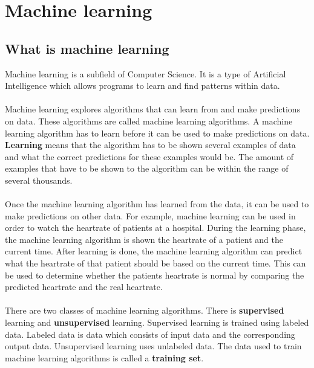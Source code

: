 
\chapter{Machine learning} %

\label{Chapter2} %
\section{What is machine learning}
Machine learning is a subfield of Computer Science. It is a type of Artificial Intelligence which allows programs to learn and find patterns within data. \cite{coursera} \\
\\
Machine learning explores algorithms that can learn from and make predictions on data. These algorithms are called machine learning algorithms. A machine learning algorithm has to learn before it can be used to make predictions on data. \textbf{Learning} means that the algorithm has to be shown several examples of data and what the correct predictions for these examples would be. The amount of examples that have to be shown to the algorithm can be within the range of several thousands. \\
\\
Once the machine learning algorithm has learned from the data, it can be used to make predictions on other data. For example, machine learning can be used in order to watch the heartrate of patients at a hospital. During the learning phase, the machine learning algorithm is shown the heartrate of a patient and  the current time. After learning is done, the machine learning algorithm can predict what the heartrate of that patient should be based on the current time. This can be used to determine whether the patients heartrate is normal by comparing the predicted heartrate and the real heartrate.\\
\\
There are two classes of machine learning algorithms. There is \textbf{supervised} learning and \textbf{unsupervised} learning. Supervised learning is trained using labeled data. Labeled data is data which consists of input data and the corresponding output data. Unsupervised learning uses unlabeled data. The data used to train machine learning algorithms is called a \textbf{training set}.\\
\\
